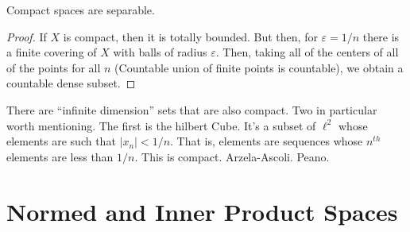\documentclass[crop=false,class=book,oneside]{standalone}                      %
\begin{document}
                \begin{theorem}
                    Compact spaces are separable.
                \end{theorem}
                \begin{proof}
                    If $X$ is compact, then
                    it is totally bounded. But
                    then, for $\varepsilon=1/n$
                    there is a finite covering of
                    $X$ with balls of radius
                    $\varepsilon$. Then,
                    taking all of the
                    centers of all of the points
                    for all $n$ (Countable union
                    of finite points is countable),
                    we obtain a countable dense
                    subset.
                \end{proof}
                \begin{example}
                    There are ``infinite dimension''
                    sets that are also compact. Two
                    in particular worth mentioning.
                    The first is the hilbert Cube.
                    It's a subset of $\ell^{2}$
                    whose elements are such that
                    $|x_{n}|<1/n$. That is, elements
                    are sequences whose $n^{th}$
                    elements are less than
                    $1/n$. This is compact.
                    Arzela-Ascoli. Peano.
                \end{example}
    \section{Normed and Inner Product Spaces}
\end{document}
